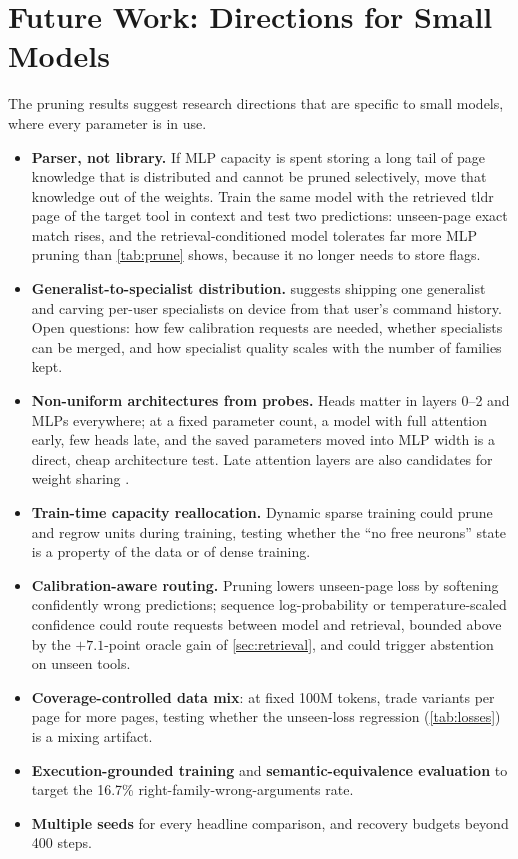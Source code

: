\documentclass[11pt,a4paper]{article}
\begin{document}
\section{Future Work: Directions for Small Models}
\label{sec:future}

The pruning results suggest research directions that are specific to small
models, where every parameter is in use.

\begin{itemize}
\item \textbf{Parser, not library.} If MLP capacity is spent storing a long
  tail of page knowledge that is distributed and cannot be pruned
  selectively, move that knowledge out of the weights. Train the same model
  with the retrieved tldr page of the target tool in context
  \citep{lewis2020rag,borgeaud2022retro} and test two predictions: unseen-page
  exact match rises, and the retrieval-conditioned model tolerates far more
  MLP pruning than \cref{tab:prune} shows, because it no longer needs to
  store flags.
\item \textbf{Generalist-to-specialist distribution.} 
  suggests shipping one generalist and carving per-user specialists on device
  from that user's command history. Open questions: how few calibration
  requests are needed, whether specialists can be merged, and how specialist
  quality scales with the number of families kept.
\item \textbf{Non-uniform architectures from probes.} Heads matter in layers
  0--2 and MLPs everywhere; at a fixed parameter count, a model with full
  attention early, few heads late, and the saved parameters moved into MLP
  width is a direct, cheap architecture test. Late attention layers are also
  candidates for weight sharing \citep{dehghani2019universal}.
\item \textbf{Train-time capacity reallocation.} Dynamic sparse training
  \citep{evci2020rigl} could prune and regrow units during training, testing
  whether the ``no free neurons'' state is a property of the data or of dense
  training.
\item \textbf{Calibration-aware routing.} Pruning lowers unseen-page loss by
  softening confidently wrong predictions; sequence log-probability or
  temperature-scaled confidence could route requests between model and
  retrieval, bounded above by the $+7.1$-point oracle gain of
  \cref{sec:retrieval}, and could trigger abstention on unseen tools.
\item \textbf{Coverage-controlled data mix}: at fixed 100M tokens, trade
  variants per page for more pages, testing whether the unseen-loss
  regression (\cref{tab:losses}) is a mixing artifact.
\item \textbf{Execution-grounded training} \citep{yang2023intercode} and
  \textbf{semantic-equivalence evaluation} to target the 16.7\%
  right-family-wrong-arguments rate.
\item \textbf{Multiple seeds} for every headline comparison, and recovery
  budgets beyond 400 steps.
\end{itemize}
\end{document}
